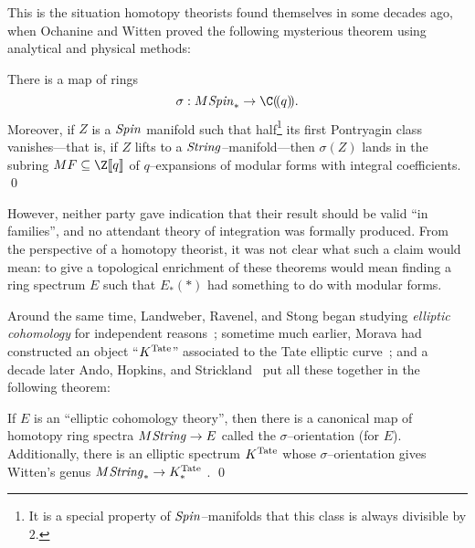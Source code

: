 This is the situation homotopy theorists found themselves in some decades ago, when Ochanine and Witten proved the following mysterious theorem using analytical and physical methods:

\begin{theorem*}
There is a map of rings \[\sigma: M\Spin_* \to \C(\!(q)\!).\]  Moreover, if \(Z\) is a \(\mathit{Spin}\) manifold such that half\footnote{It is a special property of \(\mathit{Spin}\)--manifolds that this class is always divisible by \(2\).} its first Pontryagin class vanishes---that is, if \(Z\) lifts to a \(\mathit{String}\)--manifold---then \(\sigma(Z)\) lands in the subring \(MF \subseteq \Z\ps{q}\) of \(q\)--expansions of modular forms with integral coefficients. \qed
\end{theorem*}

\noindent However, neither party gave indication that their result should be valid ``in families'', and no attendant theory of integration was formally produced.  From the perspective of a homotopy theorist, it was not clear what such a claim would mean: to give a topological enrichment of these theorems would mean finding a ring spectrum \(E\) such that \(E_*(*)\) had something to do with modular forms.

Around the same time, Landweber, Ravenel, and Stong began studying \textit{elliptic cohomology} for independent reasons~\cite{LRS}; sometime much earlier, Morava had constructed an object ``\(K^{\mathrm{Tate}}\)'' associated to the Tate elliptic curve~\cite[Section 5]{MoravaFormsOfKthy}; and a decade later Ando, Hopkins, and Strickland~\cite{AHSTheoremOfTheCube} put all these together in the following theorem:

\begin{theorem*}
If \(E\) is an ``elliptic cohomology theory'', then there is a canonical map of homotopy ring spectra \(M\mathit{String} \to E\) called the \(\sigma\)--orientation (for \(E\)).  Additionally, there is an elliptic spectrum \(K^{\mathrm{Tate}}\) whose \(\sigma\)--orientation gives Witten's genus \(M\mathit{String}_* \to K^{\mathrm{Tate}}_*\) . \qed
\end{theorem*}

